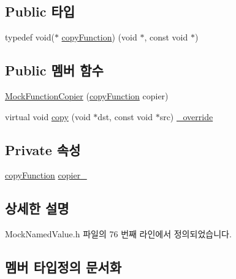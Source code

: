\subsection*{Public 타입}
\begin{DoxyCompactItemize}
\item 
typedef void($\ast$ \hyperlink{class_mock_function_copier_a19d4047094f2c0b10e80f84d198afdba}{copy\+Function}) (void $\ast$, const void $\ast$)
\end{DoxyCompactItemize}
\subsection*{Public 멤버 함수}
\begin{DoxyCompactItemize}
\item 
\hyperlink{class_mock_function_copier_a070362dc4be94b720eef449c141b788d}{Mock\+Function\+Copier} (\hyperlink{class_mock_function_copier_a19d4047094f2c0b10e80f84d198afdba}{copy\+Function} copier)
\item 
virtual void \hyperlink{class_mock_function_copier_aeba9b4dda05de7261bbf65c7af360c02}{copy} (void $\ast$dst, const void $\ast$src) \hyperlink{_cpp_u_test_config_8h_a049bea15dd750e15869863c94c1efc3b}{\+\_\+override}
\end{DoxyCompactItemize}
\subsection*{Private 속성}
\begin{DoxyCompactItemize}
\item 
\hyperlink{class_mock_function_copier_a19d4047094f2c0b10e80f84d198afdba}{copy\+Function} \hyperlink{class_mock_function_copier_a61870e0d201ecb66e5c744617c784a79}{copier\+\_\+}
\end{DoxyCompactItemize}


\subsection{상세한 설명}


Mock\+Named\+Value.\+h 파일의 76 번째 라인에서 정의되었습니다.



\subsection{멤버 타입정의 문서화}

